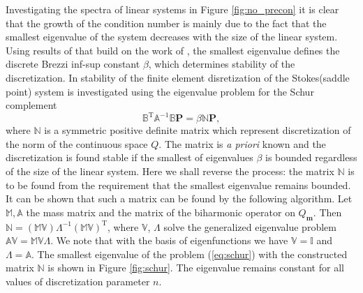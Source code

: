 \documentclass{marine_2015}
\newcommand{\Amat}{\ensuremath{\mathbb{A}}}
\newcommand{\Bmat}{\ensuremath{\mathbb{B}}}
\newcommand{\Pvec}{\ensuremath{\mathbf{P}}}
\newcommand{\Qh}{\ensuremath{Q_{\mathbf{m}}}}
\begin{document}
Investigating the spectra of linear systems in Figure \ref{fig:no_precon} it is
clear that the growth of the condition number is mainly due to the fact that the
smallest eigenvalue of the system decreases with the size of the linear system.
Using results of \cite{marie} that build on the work of \cite{malkus}, the
smallest eigenvalue defines the discrete Brezzi inf-sup constant $\beta$, which
determines stability of the discretization. In \cite{marie} stability of the
finite element disretization of the Stokes(saddle point) system is investigated using
the eigenvalue problem for the Schur complement
\begin{equation}
  \label{eq:schur}
  \Bmat^{\text{T}}\Amat^{-1}\Bmat\Pvec = \beta\mathbb{N}\Pvec,
\end{equation}
where $\mathbb{N}$ is a symmetric positive definite matrix which
represent discretization of the norm of the continuous space $Q$. The matrix is
\textit{a priori} known and the discretization is found stable if the smallest 
of eigenvalues $\beta$ is bounded regardless of the size of the linear system. Here
we shall reverse the process: the matrix $\mathbb{N}$ is to be found from the
requirement that the smallest eigenvalue remains bounded. It can be shown that
such a matrix can be found by the following algorithm. Let $\mathbb{M},
\mathbb{A}$ the mass matrix and the matrix of the biharmonic operator on $\Qh$.
Then
$\mathbb{N}=\left(\mathbb{M}\mathbb{V}\right){\Lambda}^{-1}\left(\mathbb{M}\mathbb{V}\right)^{\text{T}}$,
where $\mathbb{V}$, $\Lambda$  solve the generalized eigenvalue problem
$\mathbb{A}\mathbb{V}=\mathbb{M}\mathbb{V}\Lambda$. We note that with the basis
of eigenfunctions we have $\mathbb{V}=\mathbb{I}$ and $\Lambda=\mathbb{A}$. The
smallest eigenvalue of the problem (\ref{eq:schur}) with the constructed matrix
$\mathbb{N}$ is shown in Figure \ref{fig:schur}. The eigenvalue remains constant
for all values of discretization parameter $n$.
\end{document}
